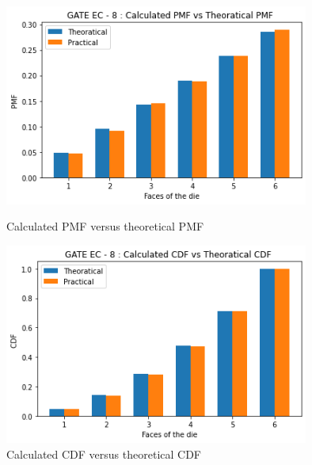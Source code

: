 \documentclass[journal,12pt,twocolumn]{IEEEtran}
\begin{document}
\begin{figure}[htp]
    \centering
    \captionsetup{justification=centering}
    \includegraphics[width=10cm]{Assignment_9_1.png}
    \caption{Calculated PMF versus theoretical PMF}
    \includegraphics[width=10cm]{Assignment_9_2.png}
    \caption{Calculated CDF versus theoretical CDF}
    \label{fig :plot}
\end{figure}
\vfill
\end{document}
